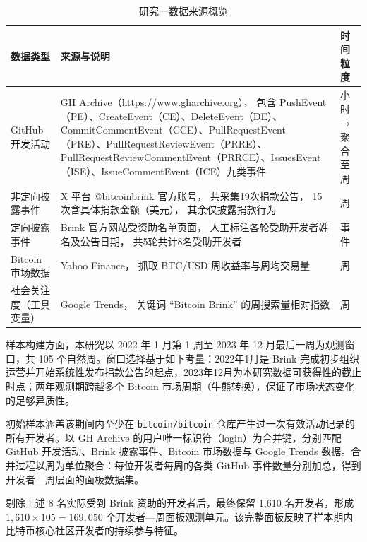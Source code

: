 \begin{table}[htbp]
    \centering
    \caption{研究一数据来源概览}
    \label{tab:data-source-1}
    \begin{tabularx}{\textwidth}{p{3cm}Xp{3cm}}
        \toprule
        数据类型 & 来源与说明 & 时间粒度 \\
        \midrule
        GitHub 开发活动
            & GH Archive（\url{https://www.gharchive.org}），
              包含 PushEvent（PE）、CreateEvent（CE）、DeleteEvent（DE）、CommitCommentEvent（CCE）、PullRequestEvent（PRE）、PullRequestReviewEvent（PRRE）、PullRequestReviewCommentEvent（PRRCE）、IssuesEvent（ISE）、IssueCommentEvent（ICE）九类事件
            & 小时 → 聚合至周 \\
        非定向披露事件
            & X 平台 @bitcoinbrink 官方账号，
              共采集19次捐款公告，
              15次含具体捐款金额（美元），
              其余仅披露捐款行为
            & 周 \\
        定向披露事件
            & Brink 官方网站受资助名单页面，
              人工标注各轮受助开发者姓名及公告日期，
              共5轮共计8名受助开发者
            & 事件 \\
        Bitcoin 市场数据
            & Yahoo Finance，
              抓取 BTC/USD 周收益率与周均交易量
            & 周 \\
        社会关注度（工具变量）
            & Google Trends，
              关键词 “Bitcoin Brink” 的周搜索量相对指数
            & 周 \\
        \bottomrule
    \end{tabularx}
\end{table}

样本构建方面，本研究以 2022 年 1 月第 1 周至 2023 年 12 月最后一周为观测窗口，共 105 个自然周。窗口选择基于如下考量：2022年1月是 Brink 完成初步组织运营并开始系统性发布捐款公告的起点，2023年12月为本研究数据可获得性的截止时点；两年观测期跨越多个 Bitcoin 市场周期（牛熊转换），保证了市场状态变化的足够异质性。

初始样本涵盖该期间内至少在 \texttt{bitcoin/bitcoin} 仓库产生过一次有效活动记录的所有开发者。以 GH Archive 的用户唯一标识符（login）为合并键，分别匹配 GitHub 开发活动、Brink 披露事件、Bitcoin 市场数据与 Google Trends 数据。合并过程以周为单位聚合：每位开发者每周的各类 GitHub 事件数量分别加总，得到开发者—周层面的面板数据集。

剔除上述 8 名实际受到 Brink 资助的开发者后，最终保留 1,610 名开发者，形成 $1{,}610 \times 105 = 169{,}050$ 个开发者—周面板观测单元。该完整面板反映了样本期内比特币核心社区开发者的持续参与特征。

